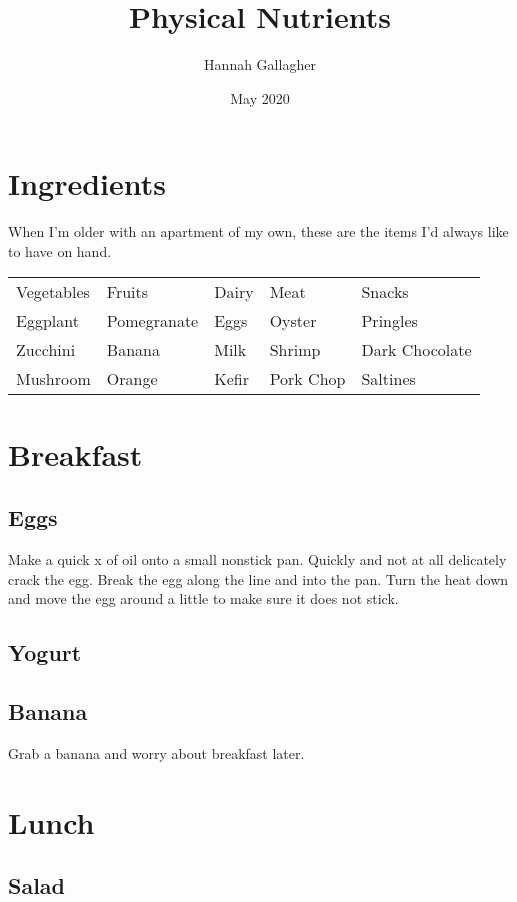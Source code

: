 \documentclass{article}
\title{Physical Nutrients}
\author{Hannah Gallagher}
\date{May 2020}
\begin{document}
\maketitle

\section*{Ingredients}
When I'm older with an apartment of my own, these are the items I'd always like to have on hand. 

\begin{table}
\begin{tabular}{lllll}
Vegetables & Fruits & Dairy & Meat & Snacks \\
Eggplant   & Pomegranate & Eggs & Oyster & Pringles \\
Zucchini   & Banana  & Milk & Shrimp & Dark Chocolate \\
Mushroom   & Orange & Kefir & Pork Chop & Saltines 
\end{tabular}
\end{table}

\section*{Breakfast}

\subsection*{Eggs}
Make a quick x of oil onto a small nonstick pan. Quickly and not at all delicately crack the egg. Break the egg along the line and into the pan. Turn the heat down and move the egg around a little to make sure it does not stick.   

\subsection*{Yogurt}

\subsection*{Banana}
Grab a banana and worry about breakfast later.

\section*{Lunch}

\subsection*{Salad}
\end{document}
